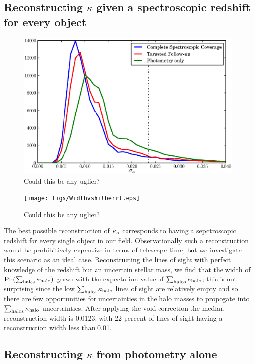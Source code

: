 \documentclass[useAMS,usenatbib]{mn2e}
\begin{document}
\subsection{Reconstructing $\kappa$ given a spectroscopic redshift for every object}

\begin{figure}
\includegraphics[width=\columnwidth]{figs/Width.eps}
\caption[magcut]{Could this be any uglier?}
\label{fig:reconwidths}
\end{figure}

\begin{figure}
\texttt{[image: figs/Widthvshilberrt.eps]}
\caption[magcut]{Could this be any uglier?}
\label{fig:widthsvsH}
\end{figure}

The best possible reconstruction of $\kappa_{\rm h}$ corresponds to having a sepctroscopic redshift for every single object in our field. Observationally such a reconstruction would be prohibitively expensive in terms of telescope time, but we investigate this scenario as an ideal case. Reconstructing the lines of sight with perfect knowledge of the redshift but an uncertain stellar mass, we find that the width of ${\rm Pr}\left(\sum_{\rm halos} \kappa_{\rm halo} \right)$ grows with the expectation value of $\sum_{\rm halos} \kappa_{\rm halo}$; this is not surprising since the low $\sum_{\rm halos} \kappa_{\rm halo}$ lines of sight are relatively empty and so there are few opportunities for uncertainties in the halo masses to propogate into $\sum_{\rm halos} \kappa_{\rm halo}$ uncertainties. After applying the void correction the median reconstruction width is 0.0123; with 22 percent of lines of sight having a reconstruction width less than 0.01. 

\subsection{Reconstructing $\kappa$ from photometry alone}
\end{document}
